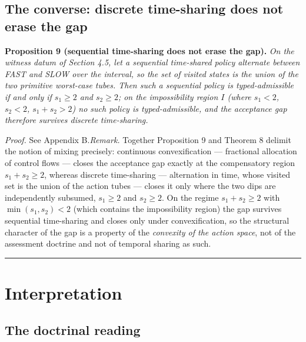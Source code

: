 \documentclass[review,11pt]{elsarticle}
\begin{document}
\subsection{The converse: discrete time-sharing does not erase
the
gap}\label{the-converse-discrete-time-sharing-does-not-erase-the-gap}

\textbf{Proposition 9 (sequential time-sharing does not erase the gap).}
\emph{On the witness datum of Section 4.5, let a sequential time-shared
policy alternate between FAST and SLOW over the interval, so the set of
visited states is the union of the two primitive worst-case tubes. Then
such a sequential policy is typed-admissible if and only if
\(s_1 \ge 2\) and \(s_2 \ge 2\); on the impossibility region \(I\)
(where \(s_1 < 2\), \(s_2 < 2\), \(s_1 + s_2 > 2\)) no such policy is
typed-admissible, and the acceptance gap therefore survives discrete
time-sharing.}

\emph{Proof.} See Appendix B.\emph{Remark.} Together Proposition 9 and Theorem 8 delimit the notion
of mixing precisely: continuous convexification --- fractional
allocation of control flows --- closes the acceptance gap exactly at the
compensatory region \(s_1 + s_2 \ge 2\), whereas discrete time-sharing
--- alternation in time, whose visited set is the union of the action
tubes --- closes it only where the two dips are independently subsumed,
\(s_1 \ge 2\) and \(s_2 \ge 2\). On the regime \(s_1 + s_2 \ge 2\) with
\(\min(s_1, s_2) < 2\) (which contains the impossibility region) the gap survives sequential time-sharing and closes only under convexification, so the structural character of the gap is a property of
the \emph{convexity of the action space}, not of the assessment doctrine
and not of temporal sharing as such.

\begin{center}\rule{0.5\linewidth}{0.5pt}\end{center}

\section{Interpretation}\label{interpretation}

\subsection{The doctrinal reading}\label{the-doctrinal-reading}
\end{document}
